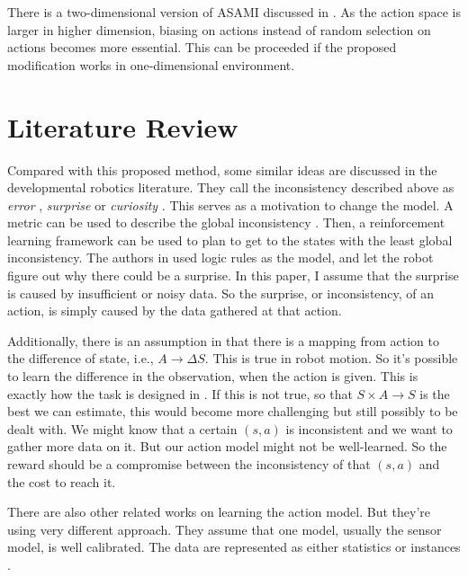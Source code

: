 \documentclass[10pt]{article}
\begin{document}
There is a two-dimensional version of ASAMI discussed in
\cite{ICRA08-stronger}.  As the action space is larger in higher
dimension, biasing on actions instead of random selection on actions
becomes more essential. This can be proceeded if the proposed
modification works in one-dimensional environment.

\section{Literature Review}

Compared with this proposed method, some similar ideas are discussed
in the developmental robotics literature. They call the inconsistency
described above as \textit{error} \cite{oudeyer2006discovering},
\textit{surprise} \cite{ranasinghe2008surprise} or \textit{curiosity}
\cite{schmidhuber2006developmental}. This serves as a motivation to
change the model. A metric can be used to describe the global
inconsistency \cite{oudeyer2006discovering}. Then, a reinforcement
learning framework can be used to plan to get to the states with the
least global inconsistency. The authors in
\cite{ranasinghe2008surprise} used logic rules as the model, and let
the robot figure out why there could be a surprise. In this paper, I
assume that the surprise is caused by insufficient or noisy data. So
the surprise, or inconsistency, of an action, is simply caused by the
data gathered at that action.

Additionally, there is an assumption in \cite{CSJ06} that there is a
mapping from action to the difference of state, i.e., $A \rightarrow
\Delta S$.  This is true in robot motion. So it's possible to learn
the difference in the observation, when the action is given. This is
exactly how the task is designed in \cite{ICDL10-hester}. If this is
not true, so that $S \times A \rightarrow S$ is the best we can
estimate, this would become more challenging but still possibly to be
dealt with. We might know that a certain $(s, a)$ is inconsistent and
we want to gather more data on it. But our action model might not be
well-learned. So the reward should be a compromise between the
inconsistency of that $(s, a)$ and the cost to reach it.

There are also other related works on learning the action model. But
they're using very different approach. They assume that one model,
usually the sensor model, is well calibrated. The data are represented
as either statistics \cite{And_learningand} or instances
\cite{LNAI2007-ahmadi}.
\end{document}
